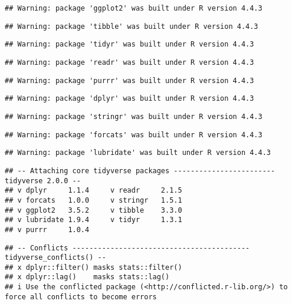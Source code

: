 \documentclass[
]{article}
\begin{document}
\begin{verbatim}
## Warning: package 'ggplot2' was built under R version 4.4.3
\end{verbatim}

\begin{verbatim}
## Warning: package 'tibble' was built under R version 4.4.3
\end{verbatim}

\begin{verbatim}
## Warning: package 'tidyr' was built under R version 4.4.3
\end{verbatim}

\begin{verbatim}
## Warning: package 'readr' was built under R version 4.4.3
\end{verbatim}

\begin{verbatim}
## Warning: package 'purrr' was built under R version 4.4.3
\end{verbatim}

\begin{verbatim}
## Warning: package 'dplyr' was built under R version 4.4.3
\end{verbatim}

\begin{verbatim}
## Warning: package 'stringr' was built under R version 4.4.3
\end{verbatim}

\begin{verbatim}
## Warning: package 'forcats' was built under R version 4.4.3
\end{verbatim}

\begin{verbatim}
## Warning: package 'lubridate' was built under R version 4.4.3
\end{verbatim}

\begin{verbatim}
## -- Attaching core tidyverse packages ------------------------ tidyverse 2.0.0 --
## v dplyr     1.1.4     v readr     2.1.5
## v forcats   1.0.0     v stringr   1.5.1
## v ggplot2   3.5.2     v tibble    3.3.0
## v lubridate 1.9.4     v tidyr     1.3.1
## v purrr     1.0.4
\end{verbatim}

\begin{verbatim}
## -- Conflicts ------------------------------------------ tidyverse_conflicts() --
## x dplyr::filter() masks stats::filter()
## x dplyr::lag()    masks stats::lag()
## i Use the conflicted package (<http://conflicted.r-lib.org/>) to force all conflicts to become errors
\end{verbatim}
\end{document}
